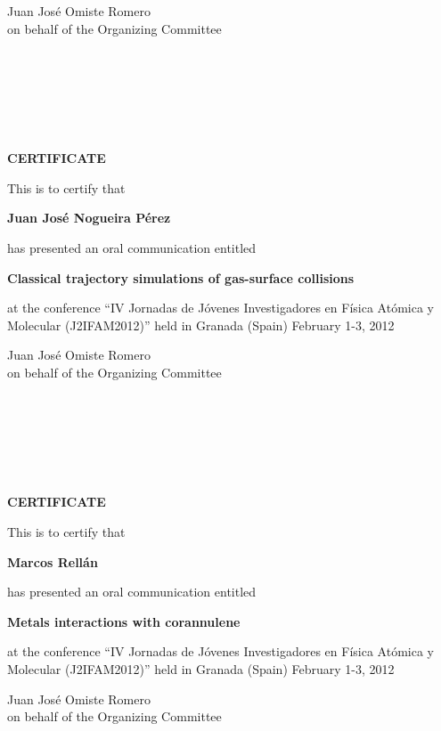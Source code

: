 \documentclass [13pt,a4paper] {letter}
\begin{document}
\vspace {3cm}
\begin{raggedleft}
Juan José Omiste Romero\\
on behalf of the Organizing Committee
\newpage
\end{raggedleft}
\begin{verbatim}






\end{verbatim}
\pagestyle{empty}
\begin{center}
{\bf {\Huge CERTIFICATE}}

\vspace {1.5cm}
This is to certify that
\vspace {1cm}

{\bf \Large  Juan José    Nogueira Pérez }
\vspace {1cm}

has presented an oral communication entitled
\vspace {1cm}

{\bf \large  Classical trajectory simulations of gas-surface collisions }
\vspace {1cm}

at the conference { \textquotedblleft IV Jornadas de Jóvenes Investigadores en Física Atómica y Molecular (J2IFAM2012)\textquotedblright} 
held in Granada (Spain) February 1-3, 2012
\end{center}
\vspace {3cm}
\begin{raggedleft}
Juan José Omiste Romero\\
on behalf of the Organizing Committee
\newpage
\end{raggedleft}
\begin{verbatim}






\end{verbatim}
\pagestyle{empty}
\begin{center}
{\bf {\Huge CERTIFICATE}}

\vspace {1.5cm}
This is to certify that
\vspace {1cm}

{\bf \Large  Marcos    Rellán }
\vspace {1cm}

has presented an oral communication entitled
\vspace {1cm}

{\bf \large  Metals interactions with corannulene }
\vspace {1cm}

at the conference { \textquotedblleft IV Jornadas de Jóvenes Investigadores en Física Atómica y Molecular (J2IFAM2012)\textquotedblright} 
held in Granada (Spain) February 1-3, 2012
\end{center}
\vspace {3cm}
\begin{raggedleft}
Juan José Omiste Romero\\
on behalf of the Organizing Committee
\newpage
\end{raggedleft}
\end{document}
